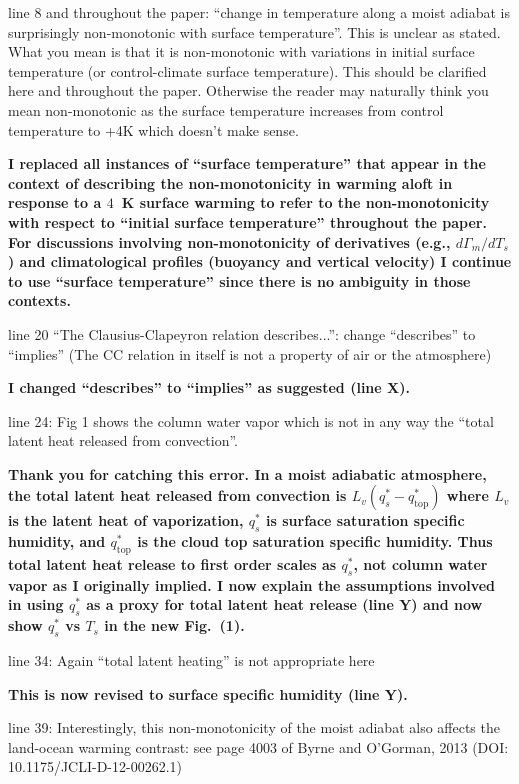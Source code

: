 \documentclass{article}
\begin{document}
line 8 and throughout the paper: ``change in temperature along a moist adiabat is surprisingly non-monotonic with surface temperature''. This is unclear as stated. What you mean is that it is non-monotonic with variations in initial surface temperature (or control-climate surface temperature). This should be clarified here and throughout the paper. Otherwise the reader may naturally think you mean non-monotonic as the surface temperature increases from control temperature to +4K which doesn't make sense.
\par
\textbf{I replaced all instances of ``surface temperature'' that appear in the context of describing the non-monotonicity in warming aloft in response to a $4$~K surface warming to refer to the non-monotonicity with respect to ``initial surface temperature'' throughout the paper. For discussions involving non-monotonicity of derivatives (e.g., $d\Gamma_m/dT_s$) and climatological profiles (buoyancy and vertical velocity) I continue to use ``surface temperature'' since there is no ambiguity in those contexts.}
\par
line 20 ``The Clausius-Clapeyron relation describes...'':  change ``describes'' to ``implies'' (The CC relation in itself is not a property of air or the atmosphere)
\par
\textbf{I changed ``describes'' to ``implies'' as suggested (line X).}
\par
line 24: Fig 1 shows the column water vapor which is not in any way the ``total latent heat released from convection''.
\par
\textbf{Thank you for catching this error. In a moist adiabatic atmosphere, the total latent heat released from convection is $L_v(q_s^*-q_\mathrm{top}^*)$ where $L_v$ is the latent heat of vaporization, $q_s^*$ is surface saturation specific humidity, and $q_\mathrm{top}^*$ is the cloud top saturation specific humidity. Thus total latent heat release to first order scales as $q_s^*$, not column water vapor as I originally implied. I now explain the assumptions involved in using $q_s^*$ as a proxy for total latent heat release (line Y) and now show $q_s^*$ vs $T_s$ in the new Fig.~(1).}
\par
line 34: Again ``total latent heating'' is not appropriate here
\par
\textbf{This is now revised to surface specific humidity (line Y).}
\par
line 39: Interestingly, this non-monotonicity of the moist adiabat also affects the land-ocean warming contrast: see page 4003 of Byrne and O'Gorman, 2013 (DOI: 10.1175/JCLI-D-12-00262.1)
\end{document}
